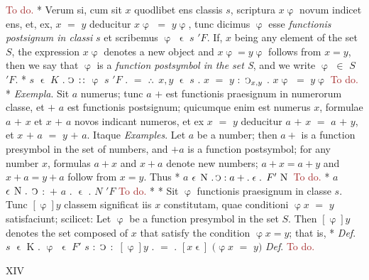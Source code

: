\documentclass{book}
\newcommand{\s}{\switchcolumn} %
\newcommand{\C}{\mathop{\sbox0{$\displaystyle$$\reflectbox{C}$} %
\raisebox{-\height+\ht0-0.05cm}[\ht0][\dp0]{\scalebox{0.8}[0.8]{\copy0}}}\displaylimits} %
\newcommand{\pppNoSpace}{\leavevmode\lower0ex\hbox{.}\kern-0.1em\raise0.7ex\hbox{.}\kern-0.1em\lower0ex\hbox{.}} %
\newcommand{\smallIn}{\ensuremath{\mathrel{\epsilon}}}
\newcommand{\N}{\mathop{\thinspace \text{N} \thinspace}}
\newcommand\todo{\textcolor{brown}{To do.}}
\newcommand{\peanoPage}[1]{\vspace{1ex}

  \columnratio{0.475, 0.05, 0.475} \begin{paracol}{3} \centering \hdashrule{\columnwidth}{0.1mm}{0.1mm 1mm} \s #1 \s \hdashrule{\columnwidth}{0.1mm}{0.1mm 1mm} \end{paracol}

\vspace{1ex}}
\newenvironment{translateTwoCol}
               { %
                 \columnratio{0.5, 0.5} \begin{paracol}{2}
                 \newcommand{\LAT}{\switchcolumn[0]*}
                 \newcommand{\ENG}{\switchcolumn[1]}
               }
               { %
                 \let\ENG\undefined
                 \let\LAT\undefined
                 \end{paracol}
               }
\begin{document}
\begin{translateTwoCol}
\ENG
\todo
\LAT
Verum si, cum sit $x$ quodlibet ens classis $s$, scriptura $x\upvarphi$ novum indicet ens, et, ex, $x$ $=$ $y$ deducitur $x\upvarphi$ $=$ $y\upvarphi$, tunc dicimus $\upvarphi$ esse \emph{functionis postsignum in classi} $s$ et scribemus $\upvarphi$ $\smallIn$ $s$ $'F$.
\ENG
If, $x$ being any element of the set $S$, the expression $x\upvarphi$ denotes a new object and $x\upvarphi = y\upvarphi$ follows from $x=y$, then we say that $\upvarphi$ is a \emph{function postsymbol in the set S}, and we write $\upvarphi$ $\in$ $S$ $'F$.
\LAT
\hspace{1.06cm} $s$ $\smallIn$ $K$ $.$ $\C$ $:\hspace{0.1em}:$ $\upvarphi$ $s$ $'F$ $.$ $=$ $\pppNoSpace$ $x,y$ $\smallIn$ $s$ $.$ $x$ $=$ $y$ $:$ $\C_{x,y}$ $.$ $x\upvarphi$ $=$ $y\upvarphi$
\ENG
\todo
\LAT
\emph{Exempla}. Sit $a$ numerus; tunc $a$ $+$ est functionis praesignum in numerorum classe, et $+$ $a$ est functionis postsignum; quicumque enim est numerus $x$, formulae $a$ $+$ $x$ et $x$ $+$ $a$ novos indicant numeros, et ex $x$ $=$ $y$ deducitur $a$ $+$ $x$ $=$ $a$ $+$ $y$, et $x$ $+$ $a$ $=$ $y$ $+$ $a$. Itaque
\ENG
\emph{Examples}. Let $a$ be a number; then $a+$ is a function presymbol in the set of numbers, and $+a$ is a function postsymbol; for any number $x$, formulas $a+x$ and $x+a$ denote new numbers; $a+x=a+y$ and $x+a=y+a$ follow from $x=y$. Thus
\LAT
\hspace{1.06cm} $a$ $\smallIn \N . \C : a + . \smallIn .$ $F' \N$
\ENG
\todo
\LAT
\hspace{1.06cm} $a$ $\smallIn \N .$ $\C$ $:$ $+$ $a$ $.$ $\smallIn$ $.$ $N$ $'F$
\ENG
\todo
\LAT
\hfill
\ENG
\hfill
\LAT
Sit $\upvarphi$ functionis praesignum in classe $s$. Tunc $[\upvarphi] y$ classem significat iis $x$ constitutam, quae conditioni $\upvarphi x$ $=$ $y$ satisfaciunt; scilicet:
\ENG
Let $\upvarphi$ be a function presymbol in the set $S$. Then $[\upvarphi] y$ denotes the set composed of $x$ that satisfy the condition $\upvarphi x = y$; that is,
\LAT
\emph{Def}. \hspace{0.25cm} $s$ $\smallIn$ K $.$ $\upvarphi$ $\smallIn$ $F'$ $s$ $:$ $\C$ $:$ $[\upvarphi]y$ $.$ $=$ $.$ $[x \smallIn]$ $(\upvarphi x$ $=$ $y)$
\ENG
\emph{Def}. \hspace{0.25cm} \todo
\end{translateTwoCol}

\peanoPage{XIV} %
\end{document}
